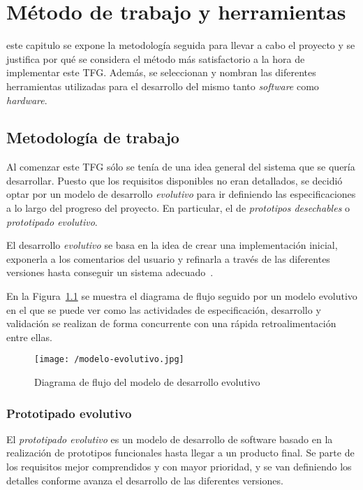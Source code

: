 \chapter{Método de trabajo y herramientas}
\label{chap:metodo}

 este capitulo se expone la metodología seguida para llevar a cabo el proyecto y se
justifica por qué se considera el método más satisfactorio a la hora de implementar este
\acs{TFG}. Además, se seleccionan y nombran las diferentes herramientas utilizadas para el
desarrollo del mismo tanto \emph{software} como \emph{hardware}.

\section{Metodología de trabajo}
\label{sec:metodologia}

Al comenzar este \acs{TFG} sólo se tenía de una idea general del sistema que se quería
desarrollar. Puesto que los requisitos disponibles no eran detallados, se decidió optar por un
modelo de desarrollo \emph{evolutivo} para ir definiendo las especificaciones a lo largo del
progreso del proyecto. En particular, el de \emph{prototipos desechables} o \emph{prototipado
  evolutivo}.

El desarrollo \emph{evolutivo} se basa en la idea de crear una implementación inicial,
exponerla a los comentarios del usuario y refinarla a través de las diferentes versiones hasta
conseguir un sistema adecuado~\cite{Sommerville14}.

En la Figura~\ref{fig:modelo-evolutivo} se muestra el diagrama de flujo seguido por un modelo
evolutivo en el que se puede ver como las actividades de especificación, desarrollo y validación se
realizan de forma concurrente con una rápida retroalimentación entre ellas.

\begin{figure}[!h]
  \begin{center}
    \texttt{[image: /modelo-evolutivo.jpg]}
    \caption{Diagrama de flujo del modelo de desarrollo evolutivo}
    \label{fig:modelo-evolutivo}
  \end{center}
\end{figure}

\subsection{Prototipado evolutivo}

El \emph{prototipado evolutivo} es un modelo de desarrollo de software basado en la realización de
prototipos funcionales hasta llegar a un producto final. Se parte de los requisitos mejor
comprendidos y con mayor prioridad, y se van definiendo los detalles conforme avanza el desarrollo
de las diferentes versiones.

